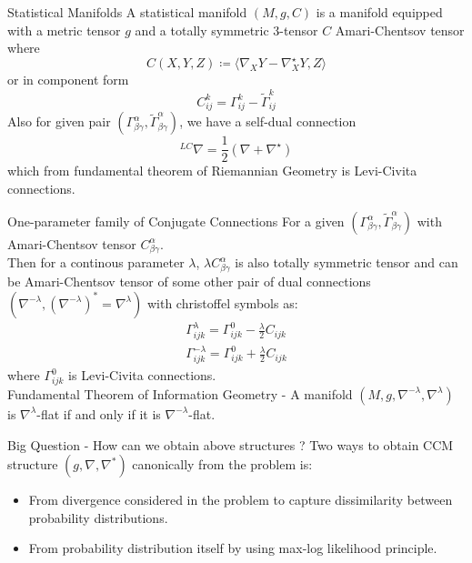 \documentclass{beamer}
\begin{document}
\begin{frame}{Statistical Manifolds}
    A statistical manifold $(M, g, C)$ is a manifold equipped with a metric tensor $g$ and a totally symmetric 3-tensor $C$ Amari-Chentsov tensor where
    \begin{equation*}
        C(X, Y, Z) \coloneqq \langle\nabla_{X}Y - \nabla^{\star}_{X}Y, Z\rangle
    \end{equation*} or in component form
    \begin{equation*}
        C^{k}_{ij} = \Gamma^{k}_{ij} - \tilde{\Gamma}^{k}_{ij}
    \end{equation*} Also for given pair $(\Gamma^{\alpha}_{\beta\gamma}, \tilde{\Gamma}^{\alpha}_{\beta\gamma})$, we have a self-dual connection 
    \begin{equation*}
        ^{LC}{\nabla} = \frac{1}{2}(\nabla + \nabla^{\star})
    \end{equation*} which from fundamental theorem of Riemannian Geometry is Levi-Civita connections.
\end{frame}
\begin{frame}{One-parameter family of Conjugate Connections}
    For a given $(\Gamma^{\alpha}_{\beta\gamma}, \tilde{\Gamma}^{\alpha}_{\beta\gamma})$ with Amari-Chentsov tensor $C^{\alpha}_{\beta\gamma}$. \\
    \vspace{5mm}
    Then for a continous parameter $\lambda$, $\lambda C^{\alpha}_{\beta\gamma}$ is also totally symmetric tensor and can be Amari-Chentsov tensor of some other pair of dual connections $(\nabla^{-\lambda}, (\nabla^{-\lambda})^{\ast} = \nabla^{\lambda})$ with christoffel symbols as:
    \begin{align*}
       \Gamma^{\lambda}_{ijk} = \Gamma^{0}_{ijk} - \frac{\lambda}{2}C_{ijk} \\
       \Gamma^{-\lambda}_{ijk} = \Gamma^{0}_{ijk} + \frac{\lambda}{2}C_{ijk}
\end{align*} where $\Gamma^{0}_{ijk}$ is Levi-Civita connections. \\
\vspace{5mm}
Fundamental Theorem of Information Geometry - A manifold $(M, g, \nabla^{-\lambda}, \nabla^{\lambda})$ is $\nabla^{\lambda}$-flat if and only if it is $\nabla^{-\lambda}$-flat.
\end{frame}
\begin{frame}{Big Question - How can we obtain above structures ?}
    Two ways to obtain CCM structure $(g, \nabla, \nabla^{\ast})$ canonically from the problem is:
    \begin{itemize}
        \item From divergence considered in the problem to capture dissimilarity between probability distributions.
        \item From probability distribution itself by using max-log likelihood principle.
    \end{itemize}
    \vspace{10mm}
\end{frame}
\end{document}

